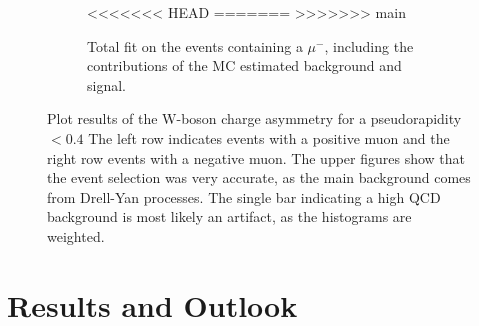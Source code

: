 \documentclass[%
 reprint,
 amsmath,amssymb,
 aps,
]{revtex4-2}
\begin{document}
\begin{figure}
\begin{subfigure}[b]{0.475\textwidth}
            \caption{Total fit on the events containing a $\mu^-$, including the contributions of the MC estimated background and signal.}   
<<<<<<< HEAD
            \label{fig:W_asym_d}
=======
            \label{fig:mean and std of net44}
>>>>>>> main
        \end{subfigure}
        \caption{Plot results of the W-boson charge asymmetry for a pseudorapidity $< 0.4$ The left row indicates events with a positive muon and the right row events with a negative muon. The upper figures show that the event selection was very accurate, as the main background comes from Drell-Yan processes. The single bar indicating a high QCD background is most likely an artifact, as the histograms are weighted.}
        \label{fig:W_asym}
\end{figure}



\section{Results and Outlook}
\end{document}
